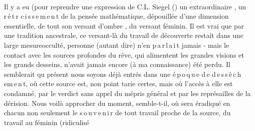 Il y a eu (pour reprendre une expression de C.L. Siegel (\textsuperscript{}) un extraordinaire , un \mbox{r\,é\,t\,r\,\,c\,i\,s\,s\,e\,m\,e\,n\,t} de la pensée mathématique, dépouillée d'une dimension essentielle, de tout son versant d'ombre , du versant féminin. Il est vrai que par une tradition ancestrale, ce versant-là du travail de découverte restait dans une large mesure\handwritten{/}occulté, personne (autant dire) n'en \mbox{p\,a\,r\,l\,a\,i\,t} jamais - mais le contact  avec les sources profondes du rêve, qui alimentent les grandes visions et les grands desseins, n'avait jamais encore (à ma connaissance) été perdu. Il semblerait qu  présent nous soyons déjà entrés dans une \mbox{é\,p\,o\,q\,u\,e} \mbox{d\,e} \mbox{d\,e\,s\,s\,è\,c\,h\,e}\mbox{m\,e\,n\,t}, où cette source est, non point tarie certes, mais où l'accès à elle est condamné, par le verdict sans appel du mépris général et par les représailles de la dérision. \handwritten{\(\big\Vert\)}Nous voilà approcher du moment, semble-t-il, où sera éradiqué en chacun non seulement le \mbox{s\,o\,u\,v\,e\,n\,i\,r} de tout travail proche de la source, du travail au féminin (ridiculisé
